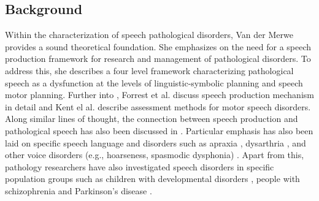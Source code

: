 \documentclass{article}
\begin{document}
\subsection{Background}
Within the characterization of speech pathological disorders, Van der Merwe \cite{mcneil2009clinical} provides a sound theoretical foundation. 
She emphasizes on the need for a speech production framework for research and management of pathological disorders. 
To address this, she describes a four level framework characterizing pathological speech as a dysfunction at the levels of linguistic-symbolic planning and speech motor planning. 
Further into \cite{mcneil2009clinical}, Forrest et al. discuss speech production mechanism in detail and Kent el al. describe assessment methods for motor speech disorders. 
Along similar lines of thought, the connection between speech production and pathological speech has also been discussed in \cite{netsell1991neurobiologic}. 
Particular emphasis has also been laid on specific speech language and disorders such as apraxia \cite{wambaugh2002summary}, dysarthria \cite{yorkston2007evidence}, and other voice disorders (e.g., hoarseness, spasmodic dysphonia) \cite{aronson2011clinical}. 
Apart from this, pathology researchers have also investigated speech disorders in specific population groups such as children with developmental disorders \cite{millar2006impact}, people with schizophrenia \cite{delisi2001speech} and Parkinson's disease \cite{lieberman1992speech}.
\end{document}
